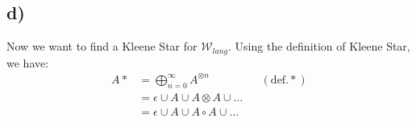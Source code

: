 \documentclass[a4paper,12pt]{ETHexercise}
\begin{document}
\subsection*{d)}

Now we want to find a Kleene Star for $\mathcal{W}_{lang}$. Using the definition of Kleene Star, we have:
\begin{align}
    A* &= \bigoplus^{\infty}_{n=0}A^{\otimes n} &&(\text{def.} *)\\
     &= \epsilon \cup A \cup A \otimes A \cup \dots\\ 
     &= \epsilon \cup A \cup A \circ A \cup \dots\\ 
\end{align}
\end{document}
